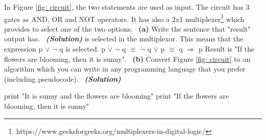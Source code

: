 \documentclass[a4 paper]{article}
\numberwithin{equation}{section}
\newcommand{\subproblem}[1]{~\newline\textbf{(#1)}}
\newcommand{\solution}{~\newline\textbf{\textit{(Solution)}} }
\newcommand{\0}{\mathbf{0}}
\begin{document}
In Figure \ref{fig: circuit}, the two statements are used as input. The circuit has 3 gates as AND, OR and NOT operators. It has also a 2x1 multiplexer\footnote{https://www.geeksforgeeks.org/multiplexers-in-digital-logic/} which provides to select one of the two options. 
\subproblem{a} Write the sentence that "result" output has.
\solution\newline{} is selected in the multiplexor. This means that the expression p $\vee$ $\neg$ q is selected.\newline
p $\vee$ $\neg$ q $\equiv$ $\neg$ q $\vee$ p $\equiv$ q $\Rightarrow$ p \newline
Result is "If the flowers are blooming, then it is sunny".\newline
\subproblem{b} Convert Figure \ref{fig: circuit} to an algorithm which you can write in any programming language that you prefer (including pseudocode).
\solution \newline
\begin{algorithmic}
\STATE print "It is sunny and the flowers are blooming"
\ELSE
\STATE print "If the flowers are blooming, then it is sunny"
\ENDIF
\end{algorithmic}
\end{document}

